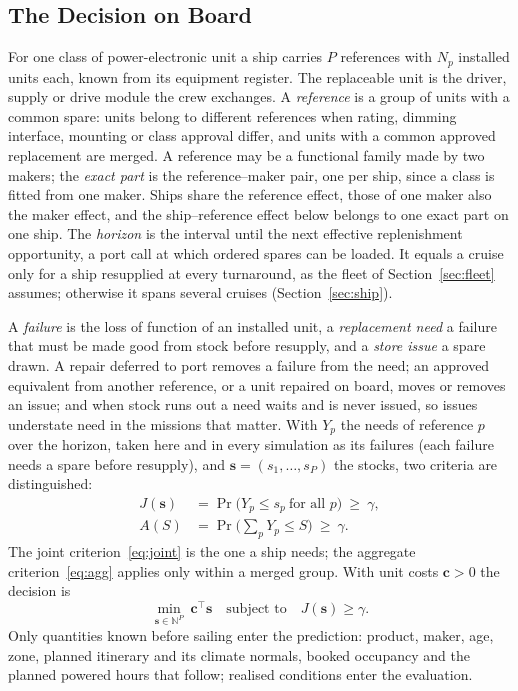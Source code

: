 \subsection{The Decision on Board}
\label{sec:decision}
For one class of power-electronic unit a ship carries $P$ references with
$N_p$ installed units each, known from its equipment register. The
replaceable unit is the driver, supply or drive module the crew exchanges. A
\emph{reference} is a group of units with a common spare: units belong to
different references when rating, dimming interface, mounting or class
approval differ, and units with a common approved replacement are merged. A
reference may be a functional family made by two makers; the \emph{exact
part} is the reference--maker pair, one per ship, since a class is fitted from
one maker. Ships share the reference effect, those of one maker also the maker
effect, and the ship--reference effect below belongs to one exact part on one
ship. The \emph{horizon} is the interval until the next effective
replenishment opportunity, a port call at which ordered spares can be loaded.
It equals a cruise only for a ship resupplied at every turnaround, as the
fleet of Section~\ref{sec:fleet} assumes; otherwise it spans several cruises
(Section~\ref{sec:ship}).

A \emph{failure} is the loss of function of an installed unit, a
\emph{replacement need} a failure that must be made good from stock before
resupply, and a \emph{store issue} a spare drawn. A repair deferred to port
removes a failure from the need; an approved equivalent from another
reference, or a unit repaired on board, moves or removes an issue; and when
stock runs out a need waits and is never issued, so issues understate need in
the missions that matter. With $Y_p$ the needs of reference $p$ over the
horizon, taken here and in every simulation as its failures (each failure
needs a spare before resupply), and $\mathbf s=(s_1,\dots,s_P)$ the
stocks, two criteria are distinguished:
\begin{align}
J(\mathbf s)&=\Pr\big(Y_p\le s_p\ \text{for all } p\big)\ \ge\ \gamma,
\label{eq:joint}\\
A(S)&=\Pr\Big(\textstyle\sum_p Y_p\le S\Big)\ \ge\ \gamma .
\label{eq:agg}
\end{align}
The joint criterion~\eqref{eq:joint} is the one a ship needs; the
aggregate criterion~\eqref{eq:agg} applies only within a merged group. With
unit costs $\mathbf c>0$ the decision is
\begin{equation}
\min_{\mathbf s\in\mathbb N^P}\ \mathbf c^\top\mathbf s
\quad\text{subject to}\quad J(\mathbf s)\ge\gamma .
\label{eq:ip}
\end{equation}
Only quantities known before sailing enter the prediction: product, maker,
age, zone, planned itinerary and its climate normals, booked occupancy and the
planned powered hours that follow; realised conditions enter the evaluation.

